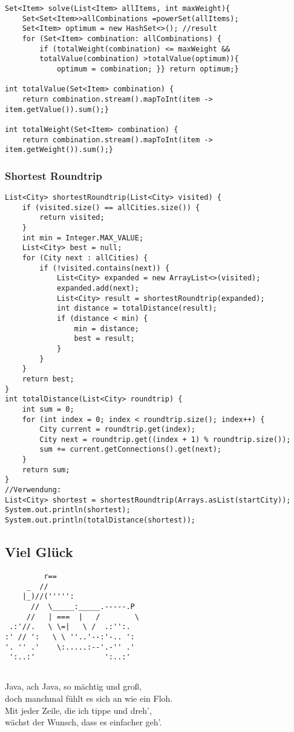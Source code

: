 \begin{multicols*}{5}
\begin{lstlisting}
Set<Item> solve(List<Item> allItems, int maxWeight){ 
	Set<Set<Item>>allCombinations =powerSet(allItems); 
	Set<Item> optimum = new HashSet<>(); //result
	for (Set<Item> combination: allCombinations) {
		if (totalWeight(combination) <= maxWeight && 
		totalValue(combination) >totalValue(optimum)){
			optimum = combination; }} return optimum;}

int totalValue(Set<Item> combination) {
	return combination.stream().mapToInt(item -> item.getValue()).sum();}

int totalWeight(Set<Item> combination) {
	return combination.stream().mapToInt(item -> item.getWeight()).sum();}
\end{lstlisting}
\subsubsection{Shortest Roundtrip}	
\begin{lstlisting}
List<City> shortestRoundtrip(List<City> visited) {
	if (visited.size() == allCities.size()) {
		return visited;
	}
	int min = Integer.MAX_VALUE;
	List<City> best = null;
	for (City next : allCities) {
		if (!visited.contains(next)) {
			List<City> expanded = new ArrayList<>(visited);
			expanded.add(next);
			List<City> result = shortestRoundtrip(expanded);
			int distance = totalDistance(result);
			if (distance < min) {
				min = distance;
				best = result;
			}
		}
	}
	return best;
}
int totalDistance(List<City> roundtrip) {
	int sum = 0;
	for (int index = 0; index < roundtrip.size(); index++) {
		City current = roundtrip.get(index);
		City next = roundtrip.get((index + 1) % roundtrip.size());
		sum += current.getConnections().get(next);
	}
	return sum;
}
//Verwendung:
List<City> shortest = shortestRoundtrip(Arrays.asList(startCity));
System.out.println(shortest);
System.out.println(totalDistance(shortest));
	\end{lstlisting}
	
\subsection{Viel Glück}	
\begin{lstlisting}
         r==
     _  //
    |_)//(''''':
      //  \_____:_____.-----.P
  	 //   | ===  |   /        \
 .:'//.   \ \=|   \ /  .:'':.
:' // ':   \ \ ''..'--:'-.. ':
'. '' .'    \:.....:--'.-'' .'
 ':..:'                ':..:'
 
\end{lstlisting}
Java, ach Java, so mächtig und groß,\\
doch manchmal fühlt es sich an wie ein Floh. \\
Mit jeder Zeile, die ich tippe und dreh',\\
wächst der Wunsch, dass es einfacher geh'.\\


\end{multicols*}
